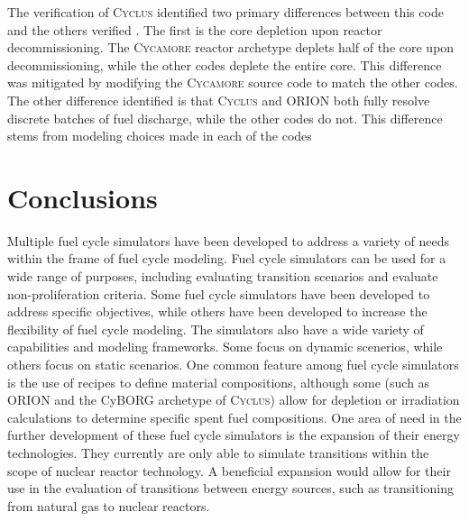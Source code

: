 \documentclass{article}
\newcommand{\Cyclus}{\textsc{Cyclus}\xspace}%
\newcommand{\Cycamore}{\textsc{Cycamore}\xspace}%
\begin{document}
    The verification of \Cyclus identified two primary differences between 
    this code and the others verified \cite{bae_standardized_2019}. The 
    first is the core depletion upon reactor decommissioning. The \Cycamore
    reactor archetype deplets half of the core upon decommissioning, while the 
    other codes deplete the entire core. This difference was mitigated by 
    modifying the \Cycamore source code to match the other codes. The other 
    difference identified is that \Cyclus and ORION both fully resolve 
    discrete batches of fuel discharge, while the other codes do not. This 
    difference stems from modeling choices made in each of the codes 

    

    \section{Conclusions}
    Multiple fuel cycle simulators have been developed to address a variety 
    of needs within the frame of fuel cycle modeling. Fuel cycle simulators 
    can be used for a wide range of purposes, including evaluating transition
    scenarios and evaluate non-proliferation criteria. Some fuel cycle 
    simulators have been developed to address specific objectives, while others 
    have been developed to increase the flexibility of fuel cycle modeling.
    The simulators also have a wide variety of capabilities and modeling frameworks.
    Some focus on dynamic scenerios, while others focus on static scenarios. 
    One common feature among fuel cycle simulators is the use of recipes to 
    define material compositions, although some (such as ORION and the CyBORG 
    archetype of \Cyclus) allow for depletion or irradiation calculations 
    to determine specific spent fuel compositions. One area of need in the 
    further development of these fuel cycle simulators is the expansion of their 
    energy technologies. They currently are only able to simulate transitions 
    within the scope of nuclear reactor technology. A beneficial expansion 
    would allow for their use in the evaluation of transitions between energy 
    sources, such as transitioning from natural gas to nuclear reactors. 
% 

   
\end{document}
